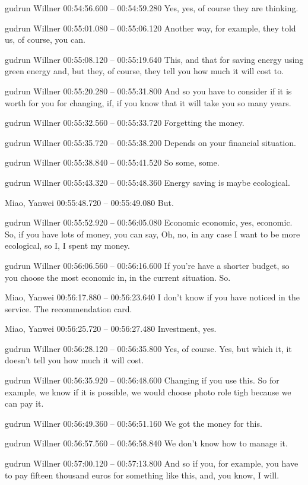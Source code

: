 {gudrun Willner 00:54:56.600 -- 00:54:59.280
Yes, yes, of course they are thinking.

gudrun Willner 00:55:01.080 -- 00:55:06.120
Another way, for example, they told us, of course, you can.

gudrun Willner 00:55:08.120 -- 00:55:19.640
This, and that for saving energy using green energy and, but they, of course, they tell you how much it will cost to.

gudrun Willner 00:55:20.280 -- 00:55:31.800
And so you have to consider if it is worth for you for changing, if, if you know that it will take you so many years.

gudrun Willner 00:55:32.560 -- 00:55:33.720
Forgetting the money.

gudrun Willner 00:55:35.720 -- 00:55:38.200
Depends on your financial situation.

gudrun Willner 00:55:38.840 -- 00:55:41.520
So some, some.

gudrun Willner 00:55:43.320 -- 00:55:48.360
Energy saving is maybe ecological.

Miao, Yanwei 00:55:48.720 -- 00:55:49.080
But.

gudrun Willner 00:55:52.920 -- 00:56:05.080
Economic economic, yes, economic. So, if you have lots of money, you can say, Oh, no, in any case I want to be more ecological, so I, I spent my money.

gudrun Willner 00:56:06.560 -- 00:56:16.600
If you're have a shorter budget, so you choose the most economic in, in the current situation. So.

Miao, Yanwei 00:56:17.880 -- 00:56:23.640
I don't know if you have noticed in the service. The recommendation card.

Miao, Yanwei 00:56:25.720 -- 00:56:27.480
Investment, yes.

gudrun Willner 00:56:28.120 -- 00:56:35.800
Yes, of course. Yes, but which it, it doesn't tell you how much it will cost.

gudrun Willner 00:56:35.920 -- 00:56:48.600
Changing if you use this. So for example, we know if it is possible, we would choose photo role tigh because we can pay it.

gudrun Willner 00:56:49.360 -- 00:56:51.160
We got the money for this.

gudrun Willner 00:56:57.560 -- 00:56:58.840
We don't know how to manage it.

gudrun Willner 00:57:00.120 -- 00:57:13.800
And so if you, for example, you have to pay fifteen thousand euros for something like this, and, you know, I will.

}
